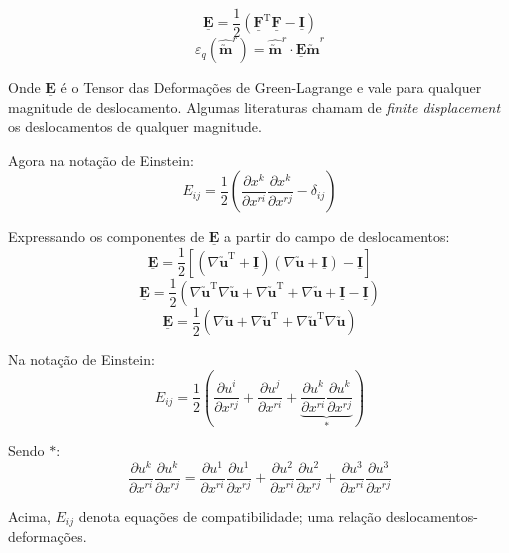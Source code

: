 \[\underline{\mathbf{E}}=\frac{1}{2}(\underline{\mathbf{F}}^{\text{T}}\underline{\mathbf{F}}-\underline{\mathbf{I}})\]
\[\varepsilon_q(\hat{\utilde{\mathbf{m}}}^r)=\hat{\utilde{\mathbf{m}}}^r\cdot\underline{\mathbf{E}}\hat{\utilde{\mathbf{m}}}^r\]
	
Onde $\underline{\mathbf{E}}$ é o Tensor das Deformações de Green-Lagrange e vale para qualquer magnitude de deslocamento. Algumas literaturas chamam de \textit{finite displacement} os deslocamentos de qualquer magnitude.
	
Agora na notação de Einstein:
\[E_{ij}=\frac{1}{2}\left(\frac{\partial x^k}{\partial x^{ri}}\frac{\partial x^k}{\partial x^{rj}}-\delta_{ij}\right)\]
	
Expressando os componentes de $\underline{\mathbf{E}}$ a partir do campo de deslocamentos:
\[\underline{\mathbf{E}}=\frac{1}{2}[(\nabla\utilde{\mathbf{u}}^{\text{T}}+\underline{\mathbf{I}})(\nabla\utilde{\mathbf{u}}+\underline{\mathbf{I}})-\underline{\mathbf{I}}]\]
\[\underline{\mathbf{E}}=\frac{1}{2}(\nabla\utilde{\mathbf{u}}^{\text{T}}\nabla\utilde{\mathbf{u}}+\nabla\utilde{\mathbf{u}}^{\text{T}}+\nabla\utilde{\mathbf{u}}+\underline{\mathbf{I}}-\underline{\mathbf{I}})\]
\[\underline{\mathbf{E}}=\frac{1}{2}(\nabla\utilde{\mathbf{u}}+\nabla\utilde{\mathbf{u}}^{\text{T}}+\nabla\utilde{\mathbf{u}}^{\text{T}}\nabla\utilde{\mathbf{u}})\]
	
Na notação de Einstein:
\[E_{ij}=\frac{1}{2}\left(\frac{\partial u^i}{\partial x^{rj}}+\frac{\partial u^j}{\partial x^{ri}}+\underbrace{\frac{\partial u^k}{\partial x^{ri}}\frac{\partial u^k}{\partial x^{rj}}}_{*}\right)\]
	
Sendo $*$:
\[\frac{\partial u^k}{\partial x^{ri}}\frac{\partial u^k}{\partial x^{rj}}=\frac{\partial u^1}{\partial x^{ri}}\frac{\partial u^1}{\partial x^{rj}}+\frac{\partial u^2}{\partial x^{ri}}\frac{\partial u^2}{\partial x^{rj}}+\frac{\partial u^3}{\partial x^{ri}}\frac{\partial u^3}{\partial x^{rj}}\]
	
Acima, $E_{ij}$ denota equações de compatibilidade; uma relação deslocamentos-deformações.